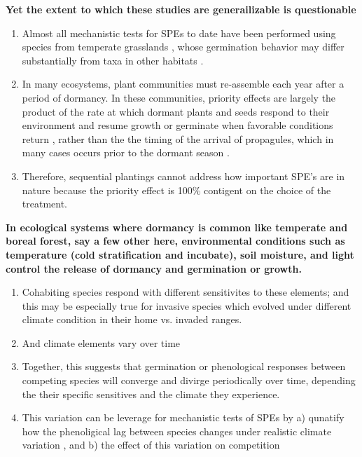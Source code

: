 \documentclass{article}\usepackage[]{graphicx}\usepackage[]{color}
\begin{document}
\textbf{Yet the extent to which these studies are generailizable is questionable}
\begin{enumerate}
\item  Almost all mechanistic tests for SPEs to date have been performed using species from temperate grasslands \citep{Weidlich:2020aa}, whose germination behavior may differ substantially from taxa in other habitats \citep{Tudela-Isanta:2018aa}.
\item In many ecosystems, plant communities must re-assemble each year after a period of dormancy. In these communities, priority effects are largely the product of the rate at which dormant plants and seeds respond to their environment and resume growth or germinate when favorable conditions return \citep{Rudolf:2019aa}, rather than the the timing of the arrival of propagules, which in many cases occurs prior to the dormant season \citep{Howe:1982aa,Baskin:1988aa}.
\item Therefore, sequential plantings cannot address how important SPE's are in nature because the priority effect is 100\% contigent on the choice of the treatment.
\end{enumerate}

\textbf{In ecological systems where dormancy is common like temperate  and boreal forest, say a few other here, environmental conditions such as temperature (cold stratification and incubate), soil moisture, and light control the release of dormancy and germination or growth.}
\begin{enumerate}
\item Cohabiting species respond with different sensitivites to these elements; and this may be especially true for invasive species which evolved under different climate condition in their home vs. invaded ranges.
\item And climate elements vary over time
\item Together, this suggests that germination or phenological responses between competing species will converge and divirge periodically over time, depending the their specific sensitives and the climate they experience.
\item This variation can be leverage for mechanistic tests of SPEs by a) qunatify how the phenoligical lag between species changes under realistic climate variation , and b) the effect of this variation on competition
\end{enumerate}
\end{document}
